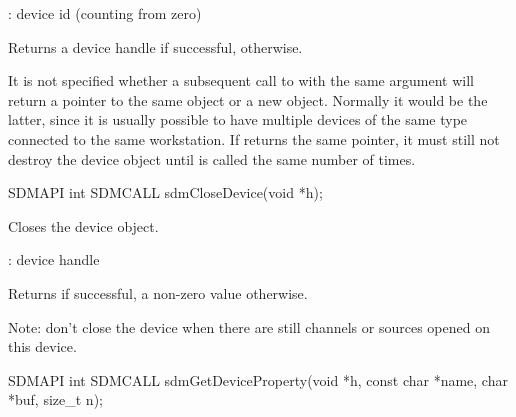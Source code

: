 \documentclass[a4paper,12pt,twoside,extrafontsizes]{memoir}
\begin{document}
\begin{funcparams}
	: device id (counting from zero)
\end{funcparams}

\begin{funcret}
	Returns a device handle if successful,  otherwise.
\end{funcret}

\begin{funcremarks}
	It is not specified whether a subsequent call to  with the same  argument will return a pointer to the same object or a new object. Normally it would be the latter, since it is usually possible to have multiple devices of the same type connected to the same workstation. If  returns the same pointer, it must still not destroy the device object until  is called the same number of times.
\end{funcremarks}



\begin{cfuncprototype}
SDMAPI int SDMCALL sdmCloseDevice(void *h);
\end{cfuncprototype}

\begin{funcdescr}
	Closes the device object.
\end{funcdescr}

\begin{funcparams}
	: device handle
\end{funcparams}

\begin{funcret}
	Returns  if successful, a non-zero value otherwise.
\end{funcret}

\begin{funcremarks}
	Note: don't close the device when there are still channels or sources opened on this device.
\end{funcremarks}



\begin{cfuncprototype}
SDMAPI int SDMCALL sdmGetDeviceProperty(void *h, const char *name, char *buf, size_t n);
\end{cfuncprototype}
\end{document}

